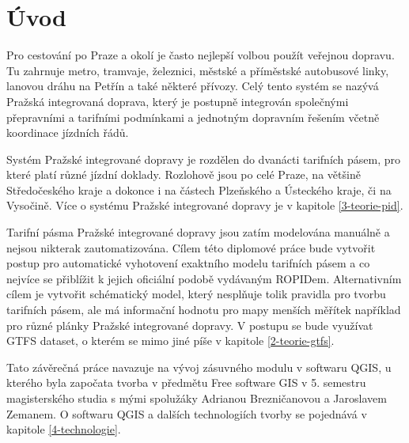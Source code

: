 \chapter*{Úvod}
\label{0-uvod}

Pro cestování po Praze a okolí je často nejlepší volbou použít veřejnou dopravu.
Tu zahrnuje metro, tramvaje, železnici, městské a příměstské autobusové linky,
lanovou dráhu na Petřín a také některé přívozy. Celý tento systém se nazývá 
Pražská integrovaná doprava, který je postupně integrován společnými přepravními
a tarifními podmínkami a jednotným dopravním řešením včetně koordinace jízdních řádů.

Systém Pražské integrované dopravy je rozdělen do dvanácti tarifních pásem, pro
které platí různé jízdní doklady. Rozlohově jsou po celé Praze, na většině
Středočeského kraje a dokonce i na částech Plzeňského a Ústeckého kraje, či na Vysočině.
Více o systému Pražské integrované dopravy je v kapitole \ref{3-teorie-pid}.

Tarifní pásma Pražské integrované dopravy jsou zatím modelována manuálně a nejsou
nikterak zautomatizována. Cílem této diplomové práce bude vytvořit postup pro
automatické vyhotovení exaktního modelu tarifních pásem a co nejvíce se přiblížit k jejich
oficiální podobě vydávaným ROPIDem. Alternativním cílem je vytvořit schématický model, který nesplňuje tolik
pravidla pro tvorbu tarifních pásem, ale má informační hodnotu pro mapy menších měřítek
například pro různé plánky Pražské integrované dopravy. V postupu se bude využívat GTFS 
dataset, o kterém se mimo jiné píše v kapitole \ref{2-teorie-gtfs}.

Tato závěrečná práce navazuje na vývoj zásuvného modulu
v softwaru QGIS, u kterého byla započata tvorba v předmětu Free software GIS
v 5. semestru magisterského studia s mými spolužáky Adrianou Brezničanovou a Jaroslavem
Zemanem. O softwaru QGIS a dalších technologiích tvorby se pojednává v kapitole 
\ref{4-technologie}.



